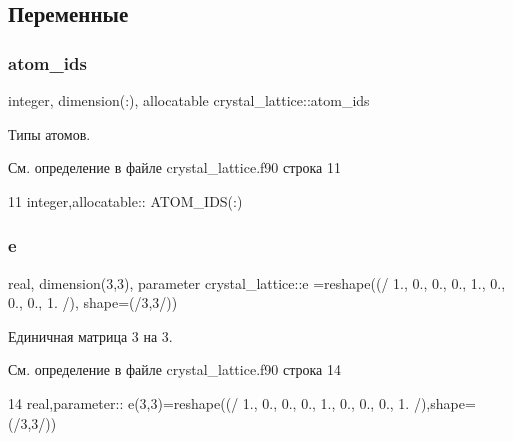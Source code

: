 \subsection{Переменные}
\mbox{\label{namespacecrystal__lattice_adf237967e114c0d9d219fdd66a5e40d0}} 
\subsubsection{\texorpdfstring{atom\+\_\+ids}{atom\_ids}}
{\footnotesize\ttfamily integer, dimension(\+:), allocatable crystal\+\_\+lattice\+::atom\+\_\+ids}



Типы атомов. 



См. определение в файле crystal\+\_\+lattice.\+f90 строка 11


\begin{DoxyCode}
11 \textcolor{keywordtype}{integer},\textcolor{keywordtype}{allocatable}:: ATOM\_IDS(:)
\end{DoxyCode}
\mbox{\label{namespacecrystal__lattice_af8549fdb12c45e36845321078acf5a90}} 
\subsubsection{\texorpdfstring{e}{e}}
{\footnotesize\ttfamily real, dimension(3,3), parameter crystal\+\_\+lattice\+::e =reshape((/ 1., 0., 0., 0., 1., 0., 0., 0., 1. /), shape=(/3,3/))}



Единичная матрица 3 на 3. 



См. определение в файле crystal\+\_\+lattice.\+f90 строка 14


\begin{DoxyCode}
14 \textcolor{keywordtype}{real},\textcolor{keywordtype}{parameter}:: e(3,3)=reshape((/ 1., 0., 0., 0., 1., 0., 0., 0., 1. /),shape=(/3,3/)) 
\end{DoxyCode}
\mbox{\label{namespacecrystal__lattice_a241136293ff688704ae81d069144f5ea}} 
